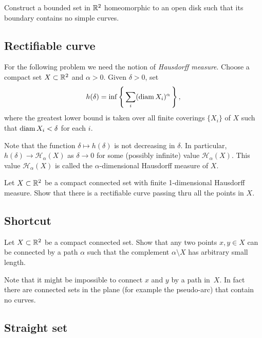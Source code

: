 \begin{pr}
Construct 
a bounded set in $\mathbb{R}^2$
homeomorphic to an open disk
such that 
its boundary contains no simple curves.
\end{pr}

\subsection*{Rectifiable curve}
\label{Rectifiable curve}

For the following problem we need the notion of 
\emph{Hausdorff measure}.
Choose a compact set $X\subset\mathbb{R}^2$ and $\alpha>0$.
Given $\delta>0$, set
\[h(\delta)=\inf\left\{\,\sum_i(\operatorname{\rm diam}\nolimits X_i)^\alpha\,\right\},\]
where the greatest lower bound is taken over all finite coverings $\{X_i\}$ of $X$ 
such that $\operatorname{\rm diam}\nolimits X_i<\delta$ for each $i$.

Note that the function $\delta\mapsto h(\delta)$ is not decreasing in $\delta$.
In particular, $h(\delta)\to \mathcal{H}_\alpha(X)$ as $\delta\to 0$ for some (possibly infinite) value $\mathcal{H}_\alpha(X)$.
This value $\mathcal{H}_\alpha(X)$ is called the $\alpha$-dimensional Hausdorff measure of $X$.

\begin{pr}
Let $X\subset \mathbb{R}^2$ be a compact connected set
with finite 1-dimensional Hausdorff measure. 
Show that there is a rectifiable curve passing thru all the points in $X$.
\end{pr}

\subsection*{Shortcut\hard}

\begin{pr}
Let $X\subset \mathbb{R}^2$ be a compact connected set. 
Show that any two points $x,y\in X$ can be connected by a path $\alpha$ such that the complement $\alpha\setminus X$ has arbitrary small length.
\end{pr}

Note that it might be impossible to connect $x$ and $y$ by a path in~$X$.
In fact there are connected sets in the plane (for example the pseudo-arc) that contain no curves.

\subsection*{Straight set}

